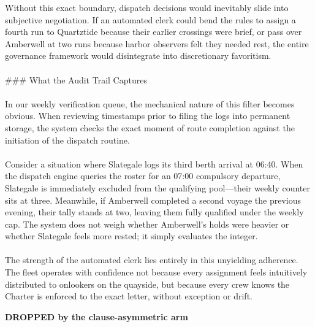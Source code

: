 \documentclass[9pt]{article}
\begin{document}
\begin{minipage}[t]{\textwidth}
\begin{minipage}[t]{0.49\textwidth}
\begin{exbox}
{  Without this exact boundary, dispatch decisions would inevitably slide into subjective negotiation. If an automated clerk could bend the rules to assign a fourth run to Quartztide because their earlier crossings were brief, or pass over Amberwell at two runs because harbor observers felt they needed rest, the entire governance framework would disintegrate into discretionary favoritism. \\
  \  \\
  \#\#\# What the Audit Trail Captures \\
  \  \\
  In our weekly verification queue, the mechanical nature of this filter becomes obvious. When reviewing timestamps prior to filing the logs into permanent storage, the system checks the exact moment of route completion against the initiation of the dispatch routine. \\
  \  \\
  Consider a situation where Slategale logs its third berth arrival at 06:40. When the dispatch engine queries the roster for an 07:00 compulsory departure, Slategale is immediately excluded from the qualifying pool---their weekly counter sits at three. Meanwhile, if Amberwell completed a second voyage the previous evening, their tally stands at two, leaving them fully qualified under the weekly cap. The system does not weigh whether Amberwell's holds were heavier or whether Slategale feels more rested; it simply evaluates the integer. \\
  \  \\
  The strength of the automated clerk lies entirely in this unyielding adherence. The fleet operates with confidence not because every assignment feels intuitively distributed to onlookers on the quayside, but because every crew knows the Charter is enforced to the exact letter, without exception or drift.}
\end{exbox}
\end{minipage}\hfill
\begin{minipage}[t]{0.49\textwidth}\fontsize{7.17}{7.89}\linespread{1}\selectfont
\textbf{DROPPED by the clause-asymmetric arm}\\[1pt]
\begin{exbox}

\end{exbox}
\end{minipage}
\end{minipage}
\end{document}
